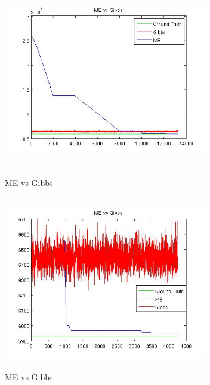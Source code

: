 \documentclass{article}
\begin{document}
\begin{spacing}{1.1}
\begin{figure}[h] 
  \begin{minipage}[b]{0.5\textwidth} 
    \centering 
    \includegraphics[width=3.5in,height=3in]{hdp_com.jpg} 
    \caption{ME vs Gibbs} 
    \label{fig:by:table} 
  \end{minipage}%
  \begin{minipage}[b]{0.5\textwidth} 
    \centering 
    \includegraphics[width=3.5in,height=3in]{hdp_com2.jpg} 
    \caption{ME vs Gibbs}
    \label{fig:by:table}  
   \end{minipage}%
\end{figure}

\end{spacing}
\end{document}
